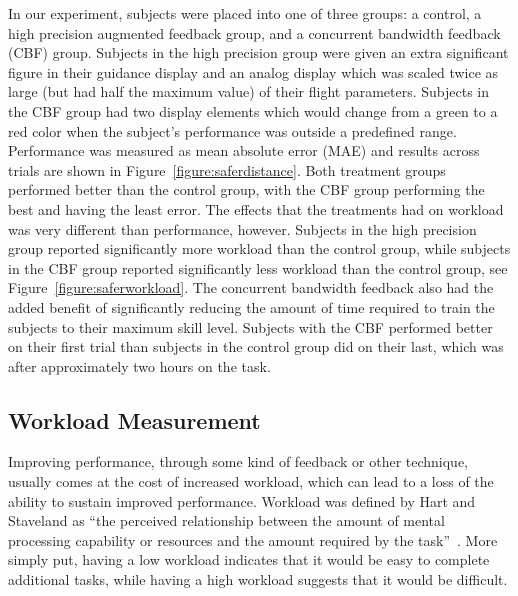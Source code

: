 \documentclass[float=false, crop=false]{standalone}
\begin{document}
In our experiment, subjects were placed into one of three groups: a control, a high precision augmented feedback group, and a concurrent bandwidth feedback (CBF) group.
Subjects in the high precision group were given an extra significant figure in their guidance display and an analog display which was scaled twice as large (but had half the maximum value) of their flight parameters.
Subjects in the CBF group had two display elements which would change from a green to a red color when the subject's performance was outside a predefined range.
Performance was measured as mean absolute error (MAE) and results across trials are shown in Figure~\ref{figure:saferdistance}.
Both treatment groups performed better than the control group, with the CBF group performing the best and having the least error.
The effects that the treatments had on workload was very different than performance, however.
Subjects in the high precision group reported significantly more workload than the control group, while subjects in the CBF group reported significantly less workload than the control group, see Figure~\ref{figure:saferworkload}.
The concurrent bandwidth feedback also had the added benefit of significantly reducing the amount of time required to train the subjects to their maximum skill level.
Subjects with the CBF performed better on their first trial than subjects in the control group did on their last, which was after approximately two hours on the task.

\subsection{Workload Measurement}
Improving performance, through some kind of feedback or other technique, usually comes at the cost of increased workload, which can lead to a loss of the ability to sustain improved performance.
Workload was defined by Hart and Staveland as ``the perceived relationship between the amount of mental processing capability or resources and the amount required by the task''~\cite{Hart1988}.
More simply put, having a low workload indicates that it would be easy to complete additional tasks, while having a high workload suggests that it would be difficult.
\end{document}
